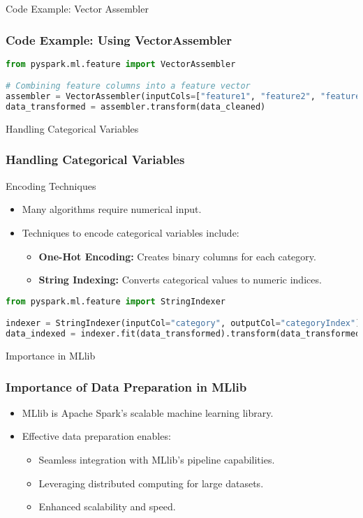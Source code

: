 \documentclass[aspectratio=169]{beamer}
\begin{document}
\begin{frame}[fragile]{Code Example: Vector Assembler}
    \frametitle{Code Example: Using VectorAssembler}
    \begin{lstlisting}[language=python]
from pyspark.ml.feature import VectorAssembler

# Combining feature columns into a feature vector
assembler = VectorAssembler(inputCols=["feature1", "feature2", "feature3"], outputCol="features")
data_transformed = assembler.transform(data_cleaned)
    \end{lstlisting}
\end{frame}

\begin{frame}[fragile]{Handling Categorical Variables}
    \frametitle{Handling Categorical Variables}
    \begin{block}{Encoding Techniques}
        \begin{itemize}
            \item Many algorithms require numerical input.
            \item Techniques to encode categorical variables include:
                \begin{itemize}
                    \item \textbf{One-Hot Encoding:} Creates binary columns for each category.
                    \item \textbf{String Indexing:} Converts categorical values to numeric indices.
                \end{itemize}
        \end{itemize}
    \end{block}
    
    \begin{lstlisting}[language=python]
from pyspark.ml.feature import StringIndexer

indexer = StringIndexer(inputCol="category", outputCol="categoryIndex")
data_indexed = indexer.fit(data_transformed).transform(data_transformed)
    \end{lstlisting}
\end{frame}

\begin{frame}[fragile]{Importance in MLlib}
    \frametitle{Importance of Data Preparation in MLlib}
    \begin{itemize}
        \item MLlib is Apache Spark's scalable machine learning library.
        \item Effective data preparation enables:
            \begin{itemize}
                \item Seamless integration with MLlib's pipeline capabilities.
                \item Leveraging distributed computing for large datasets.
                \item Enhanced scalability and speed.
            \end{itemize}
    \end{itemize}
\end{frame}
\end{document}
